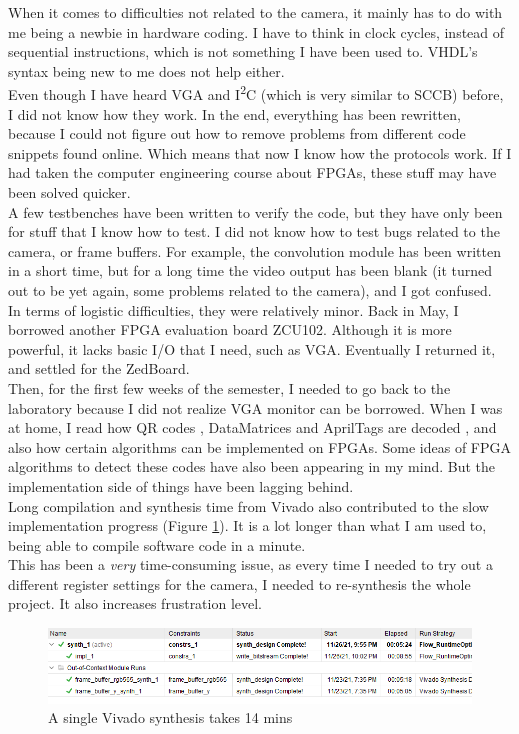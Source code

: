 \documentclass{article}
\begin{document}
	When it comes to difficulties not related to the camera, it mainly has to do with me being a newbie in hardware coding. I have to think in clock cycles, instead of sequential instructions, which is not something I have been used to. VHDL’s syntax being new to me does not help either.
	\\
	
	Even though I have heard VGA and I\textsuperscript{2}C (which is very similar to SCCB) before, I did not know how they work. In the end, everything has been rewritten, because I could not figure out how to remove problems from different code snippets found online. Which means that now I know how the protocols work. If I had taken the computer engineering course about FPGAs, these stuff may have been solved quicker.
	\\
	
	A few testbenches have been written to verify the code, but they have only been for stuff that I know how to test. I did not know how to test bugs related to the camera, or frame buffers. For example, the convolution module has been written in a short time, but for a long time the video output has been blank (it turned out to be yet again, some problems related to the camera), and I got confused.
	\\
	
	In terms of logistic difficulties, they were relatively minor. Back in May, I borrowed another FPGA evaluation board ZCU102. Although it is more powerful, it lacks basic I/O that I need, such as VGA. Eventually I returned it, and settled for the ZedBoard.
	\\
	
	Then, for the first few weeks of the semester, I needed to go back to the laboratory because I did not realize VGA monitor can be borrowed. When I was at home, I read how QR codes \cite{utube1}, DataMatrices\cite{utube2} and AprilTags are decoded \cite{apriltag}\cite{apriltag2}, and also how certain algorithms can be implemented on FPGAs. Some ideas of FPGA algorithms to detect these codes have also been appearing in my mind. But the implementation side of things have been lagging behind.
	\\
	
	Long compilation and synthesis time from Vivado also contributed to the slow implementation progress (Figure \ref{fig:vivado}). It is a lot longer than what I am used to, being able to compile software code in a minute.
	\\
	
	This has been a \emph{very} time-consuming issue, as every time I needed to try out a different register settings for the camera, I needed to re-synthesis the whole project. It also increases frustration level.
	\begin{figure}[h]
		\centering
		\includegraphics[scale=0.68]{vivado}
		\caption{A single Vivado synthesis takes 14 mins}
		\label{fig:vivado}
	\end{figure}
\end{document}
